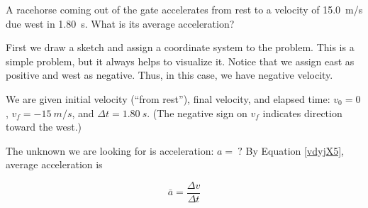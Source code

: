 \documentclass[main-ap-physics.tex]{subfiles}
\begin{document}
\begin{example}
    A racehorse coming out of the gate accelerates from rest to a velocity of \SI{15.0}{m/s} due west in \SI{1.80}{s}. What is its average acceleration?
\end{example}

\Solution First we draw a sketch and assign a coordinate system to the problem. This is a simple problem, but it always helps to visualize it. Notice that we assign east as positive and west as negative. Thus, in this case, we have negative velocity.

\begin{center}
\end{center}

We are given initial velocity (``from rest''), final velocity, and elapsed time: $v_0 = 0$, $v_f = -\SI{15}{m/s}$, and $\Delta{t} = \SI{1.80}{s}$. (The negative sign on $v_f$ indicates direction toward the west.)

\vspace{1em}

The unknown we are looking for is acceleration: $a =\ ?$ By Equation \eqref{vdyjX5}, average acceleration is

\begin{equation*}
    \bar{a} = \frac{\Delta{v}}{\Delta{t}}
\end{equation*}
\end{document}
